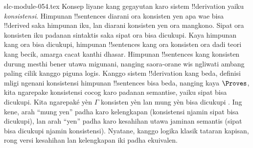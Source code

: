 \begin{filecontents*}[overwrite]{slc-module-054.tex}
Konsep liyane kang gegayutan karo sistem !!{derivation} yaiku
\emph{konsistensi}. Himpunan !!{sentence}s diarani ora konsisten yen
apa wae bisa !!{derive}d saka himpunan iku, lan diarani konsisten yen
ora mangkono. Sipat ora konsisten iku padanan sintaktis saka sipat
ora bisa dicukupi. Kaya himpunan kang ora bisa dicukupi,
himpunan !!{sentence}s
kang ora konsisten ora dadi teori kang becik, amarga cacat kanthi
dhasar. Himpunan !!{sentence}s kang konsisten durung mesthi bener utawa
migunani, nanging saora-orane wis ngliwati ambang paling cilik kanggo
piguna logis. Kanggo sistem !!{derivation} kang beda, definisi mligi
ngenani konsistensi himpunan !!{sentence}s bisa beda, nanging kaya
$\Proves$, kita ngarepake konsistensi cocog karo padanan semantise,
yaiku sipat bisa dicukupi. Kita ngarepaké yèn $\Gamma$ konsisten
yèn lan mung yèn bisa dicukupi .
Ing kene, arah ``mung yen'' padha karo kelengkapan (konsistensi njamin
sipat bisa dicukupi), lan arah ``yen'' padha karo kesahihan utawa
jaminan semantis (sipat bisa dicukupi njamin konsistensi). Nyatane,
kanggo logika klasik tataran kapisan, rong versi kesahihan lan
kelengkapan iki padha ekuivalen.


\end{filecontents*}


